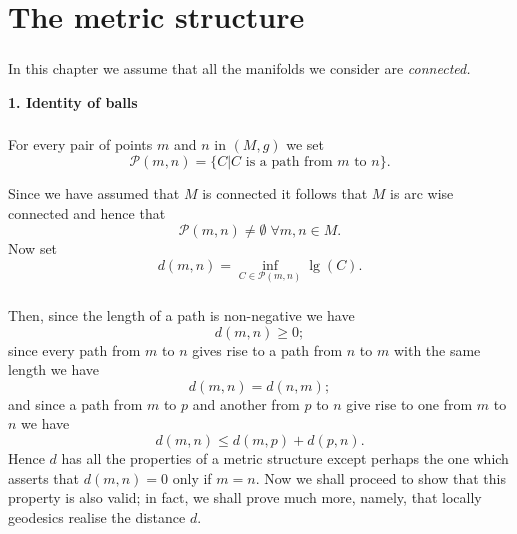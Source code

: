 \chapter{The metric structure}\label{chap7:chap7}

\setcounter{section}{1}\label{chap7:chap7-sec1}


\setcounter{subsection}{0}


\subsection{}\label{chap7:7.1.1}\pageoriginale
In this chapter we assume that all the manifolds we consider are {\em
  connected.}


\noindent
{\bf 1. Identity of balls}

\subsection{}\label{chap7:7.1.2}

\begin{defi*}
For every pair of points $m$ and $n$ in $(M,g)$ we set
$$
\mathscr{P}(m,n)=\{C|C\text{ is a path from } m \text{ to } n\}.
$$
\end{defi*}

Since we have assumed that $M$ is connected it follows that $M$ is
arc wise connected and hence that
$$
\mathscr{P}(m,n)\neq \emptyset \; \forall m,n\in M.
$$
Now set
\begin{equation*}
d(m,n)=\inf_{C\in\mathscr{P}(m,n)}\lg(C).\tag{7.1.3}\label{chap7:7.1.3}
\end{equation*}

\setcounter{subsection}{3}
\subsection{}\label{chap7:7.1.4}

Then, since the length of a path is non-negative we have
$$
d(m,n)\geq 0;
$$
since every path from $m$ to $n$ gives rise to a path from $n$ to $m$
with the same length we have
$$
d(m,n)=d(n,m);
$$
and since a path from $m$ to $p$ and another from $p$ to $n$ give rise
to one from $m$ to $n$ we have
$$
d(m,n)\leq d(m,p)+d(p,n).
$$
Hence $d$ has all the properties of a metric structure except perhaps
the one which asserts that $d(m,n)=0$ only if $m=n$. Now we shall 
proceed \pageoriginale to show that this property is also valid; in
fact, we shall prove much more, namely, that locally geodesics realise
the distance $d$. 

